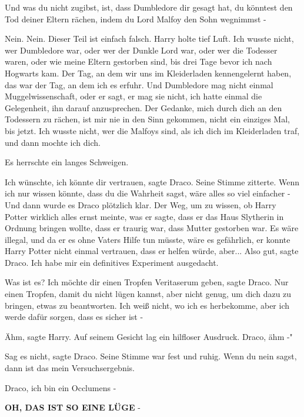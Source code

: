 \glqq Und was du nicht zugibst, ist, dass Dumbledore dir gesagt hat, du könntest
den Tod deiner Eltern rächen, indem du Lord Malfoy den Sohn wegnimmst -\grqq{}

\glqq Nein. Nein. Dieser Teil ist einfach falsch.\grqq{} Harry holte tief Luft.
\glqq Ich wusste nicht, wer Dumbledore war, oder wer der Dunkle Lord war, oder
wer die Todesser waren, oder wie meine Eltern gestorben sind, bis drei Tage
bevor ich nach Hogwarts kam. Der Tag, an dem wir uns im Kleiderladen
kennengelernt haben, das war der Tag, an dem ich es erfuhr. Und Dumbledore mag
nicht einmal Muggelwissenschaft, oder er sagt, er mag sie nicht, ich hatte
einmal die Gelegenheit, ihn darauf anzusprechen. Der Gedanke, mich durch dich an
den Todessern zu rächen, ist mir nie in den Sinn gekommen, nicht ein einziges
Mal, bis jetzt. Ich wusste nicht, wer die Malfoys sind, als ich dich im
Kleiderladen traf, und dann mochte ich dich.\grqq{}

Es herrschte ein langes Schweigen.

\glqq Ich wünschte, ich könnte dir vertrauen\grqq{}, sagte Draco. Seine Stimme
zitterte. \glqq Wenn ich nur wissen könnte, dass du die Wahrheit sagst, wäre
alles so viel einfacher -\grqq{} Und dann wurde es Draco plötzlich klar. Der
Weg, um zu wissen, ob Harry Potter wirklich alles ernst meinte, was er sagte,
dass er das Haus Slytherin in Ordnung bringen wollte, dass er traurig war, dass
Mutter gestorben war. Es wäre illegal, und da er es ohne Vaters Hilfe tun
müsste, wäre es gefährlich, er konnte Harry Potter nicht einmal vertrauen, dass
er helfen würde, aber... \glqq Also gut\grqq{}, sagte Draco. \glqq Ich habe mir
ein definitives Experiment ausgedacht.\grqq{}

\glqq Was ist es?\grqq{} \glqq Ich möchte dir einen Tropfen Veritaserum
geben\grqq{}, sagte Draco. \glqq Nur einen Tropfen, damit du nicht lügen kannst,
aber nicht genug, um dich dazu zu bringen, etwas zu beantworten. Ich weiß nicht,
wo ich es herbekomme, aber ich werde dafür sorgen, dass es sicher ist -\grqq{}

\glqq Ähm\grqq{}, sagte Harry. Auf seinem Gesicht lag ein hilfloser Ausdruck.
\glqq Draco, ähm -"

\glqq Sag es nicht\grqq{}, sagte Draco. Seine Stimme war fest und ruhig. \glqq
Wenn du nein sagst, dann ist das mein Versuchsergebnis.\grqq{}

\glqq Draco, ich bin ein Occlumens -\grqq{}

\glqq \textbf{OH, DAS IST SO EINE LÜGE }-\grqq{}

